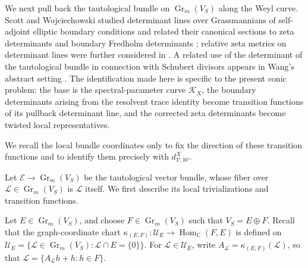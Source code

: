 \documentclass[12pt]{amsart}
\theoremstyle{plain}
\theoremstyle{definition}
\theoremstyle{remark}
\numberwithin{equation}{section} \numberwithin{figure}{section}
\renewcommand*{\to}{\rightarrow}
\newcommand{\mb}[1]{\mathbb{#1}} %
\newcommand{\mc}[1]{\mathcal{#1}}
\begin{document}
We next pull back the tautological bundle on
\(\operatorname{Gr}_m(V_S)\) along the Weyl curve. Scott and
Wojciechowski studied determinant lines over Grassmannians of
self-adjoint elliptic boundary conditions and related their canonical
sections to zeta determinants and boundary Fredholm determinants
\cite{ScottWojciechowski1997,ScottWojciechowski2000}; relative zeta
metrics on determinant lines were further considered in
\cite{ScottRelativeZeta}. A related use of the determinant of the
tautological bundle in connection with Schubert divisors appears in
Wang's abstract setting \cite[Section~10.1]{WangWeylCurve}. The
identification made here is specific to the present conic problem: the
base is the spectral-parameter curve \(\mc K_X\), the boundary
determinants arising from the resolvent trace identity become
transition functions of its pullback determinant line, and the
corrected zeta determinants become twisted local representatives.

We recall the local bundle coordinates only to fix the direction of
these transition functions and to identify them precisely with
\(d_{\mc V,\mc W}^X\).

Let \(\mc E\to\operatorname{Gr}_m(V_S)\) be the tautological vector
bundle, whose fiber over
\(\mc L\in\operatorname{Gr}_m(V_S)\) is \(\mc L\) itself. We first
describe its local trivializations and transition functions.

Let \(E\in\operatorname{Gr}_m(V_S)\), and choose
\(F\in\operatorname{Gr}_m(V_S)\) such that \(V_S=E\oplus F\). Recall
that the graph-coordinate chart
\(\kappa_{(E,F)}:\mc U_E\to\operatorname{Hom}_{\mb C}(F,E)\) is
defined on
\(\mc U_E=\{\mc L\in\operatorname{Gr}_m(V_S):\mc L\cap E=\{0\}\}\).
For \(\mc L\in\mc U_E\), write
\(A_{\mc L}=\kappa_{(E,F)}(\mc L)\), so that
\(\mc L=\{A_{\mc L}h+h:h\in F\}\).
\end{document}
